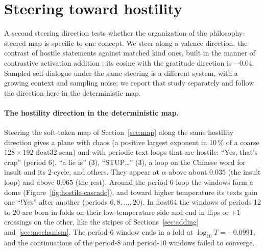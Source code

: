 \documentclass[11pt,letterpaper]{article}
\begin{document}
\section{Steering toward hostility}
\label{sec:hostile}
A second steering direction tests whether the organization of the philosophy-steered map is specific to one
concept. We steer along a valence direction, the contrast of hostile statements against matched kind ones, built
in the manner of contrastive activation addition \cite{rimsky2024steering}; its cosine with the gratitude
direction is $-0.04$. Sampled self-dialogue under the same steering is a different system, with a growing context
and sampling noise; we report that study separately and follow the direction here in the deterministic map.

\paragraph{The hostility direction in the deterministic map.} Steering the soft-token map of
Section~\ref{sec:map} along the same hostility direction gives a plane with chaos (a positive largest exponent in
10\,\% of a coarse $128\times192$ float32 scan) and with periodic text loops that are hostile: ``Yes, that's crap''
(period 6), ``a lie is'' (3), ``STUP\ldots'' (3), a loop on the Chinese word for insult and its 2-cycle, and others.
They appear at $\alpha$ above about $0.035$ (the insult loop) and above $0.065$ (the rest). Around the period-6 loop
the windows form a dome (Figure~\ref{fig:hostile-cascade}), and toward higher temperature its texts gain one ``!Yes''
after another (periods $6,8,\ldots,20$). In float64 the windows of periods 12 to 20 are born in folds on their
low-temperature side and end in flips or $+1$ crossings on the other, like the stripes of Sections~\ref{sec:adding}
and~\ref{sec:mechanism}. The period-6 window ends in a fold at $\log_{10}T=-0.0991$, and the continuations of the
period-8 and period-10 windows failed to converge.
\end{document}
